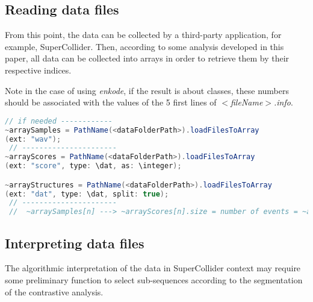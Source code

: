 \subsection{Reading data files}
\label{rdf}

From this point, the data can be collected by a third-party application, for example, SuperCollider. Then, according to some analysis developed in this paper, all data can be collected into arrays in order to retrieve them by their respective indices.

Note in the case of using \textsl{enkode}, if the result is about classes, these numbers should be associated with the values of the 5 first lines of \textsl{$<$fileName$>$.info}.

\smallskip

 \begin{lstlisting}[basicstyle=\footnotesize\ttfamily,language=Java] 
 // if needed ------------
~arraySamples = PathName(<dataFolderPath>).loadFilesToArray
(ext: "wav");
 // ----------------------
~arrayScores = PathName(<dataFolderPath>).loadFilesToArray
(ext: "score", type: \dat, as: \integer);

~arrayStructures = PathName(<dataFolderPath>).loadFilesToArray
(ext: "dat", type: \dat, split: true);
 // ----------------------
 //  ~arraySamples[n] ---> ~arrayScores[n].size = number of events = ~arrayStructures[n].sum{|subAr| subAr.size}
\end{lstlisting}  

\subsection{Interpreting data files}
\label{idf}

The algorithmic interpretation of the data in SuperCollider context may require some preliminary function to select sub-sequences according to the segmentation of the contrastive analysis. 

